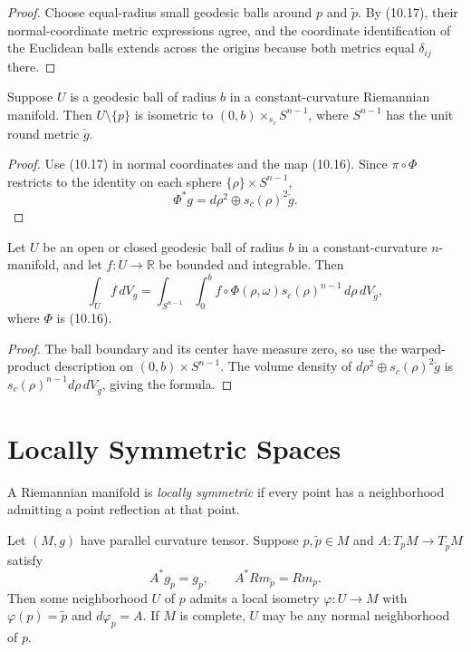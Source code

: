 \begin{proof}
\sketch
Choose equal-radius small geodesic balls around $p$ and $\widetilde p$.  By
(10.17), their normal-coordinate metric expressions agree, and the coordinate
identification of the Euclidean balls extends across the origins because both
metrics equal $\delta_{ij}$ there.
\end{proof}

\begin{corollary}
\label{cor:constant-curvature-warped-products}
Suppose $U$ is a geodesic ball of radius $b$ in a constant-curvature
Riemannian manifold.  Then $U\setminus\{p\}$ is isometric to
$(0,b)\times_{s_c}S^{n-1}$, where $S^{n-1}$ has the unit round metric
$\check g$.
\end{corollary}

\begin{proof}
\sketch
Use (10.17) in normal coordinates and the map (10.16).  Since
$\pi\circ\Phi$ restricts to the identity on each sphere
$\{\rho\}\times S^{n-1}$,
\[
\Phi^*g=d\rho^2\oplus s_c(\rho)^2\check g.
\]
\end{proof}

\begin{corollary}
\label{cor:polar-decomposition-integrals}
Let $U$ be an open or closed geodesic ball of radius $b$ in a
constant-curvature $n$-manifold, and let $f:U\to\mathbb R$ be bounded and
integrable.  Then
\[
\int_U f\,dV_g
=\int_{S^{n-1}}\int_0^b f\circ\Phi(\rho,\omega)
s_c(\rho)^{n-1}\,d\rho\,dV_{\check g},
\]
where $\Phi$ is (10.16).
\end{corollary}

\begin{proof}
\sketch
The ball boundary and its center have measure zero, so use the warped-product
description on $(0,b)\times S^{n-1}$.  The volume density of
$d\rho^2\oplus s_c(\rho)^2\check g$ is
$s_c(\rho)^{n-1}d\rho\,dV_{\check g}$, giving the formula.
\end{proof}
\section{Locally Symmetric Spaces}

A Riemannian manifold is \emph{locally symmetric} if every point has a
neighborhood admitting a point reflection at that point.

\begin{lemma}
\label{lem:locally-symmetric-cartan}

Let $(M,g)$ have parallel curvature tensor. Suppose $p,\widetilde p\in M$ and
$A:T_pM\to T_{\widetilde p}M$ satisfy
\[
A^*g_{\widetilde p}=g_p,
\qquad
A^*Rm_{\widetilde p}=Rm_p.
\]
Then some neighborhood $U$ of $p$ admits a local isometry
$\varphi:U\to M$ with
$\varphi(p)=\widetilde p$ and $d\varphi_p=A$. If $M$ is complete, $U$ may be
any normal neighborhood of $p$.
\end{lemma}

